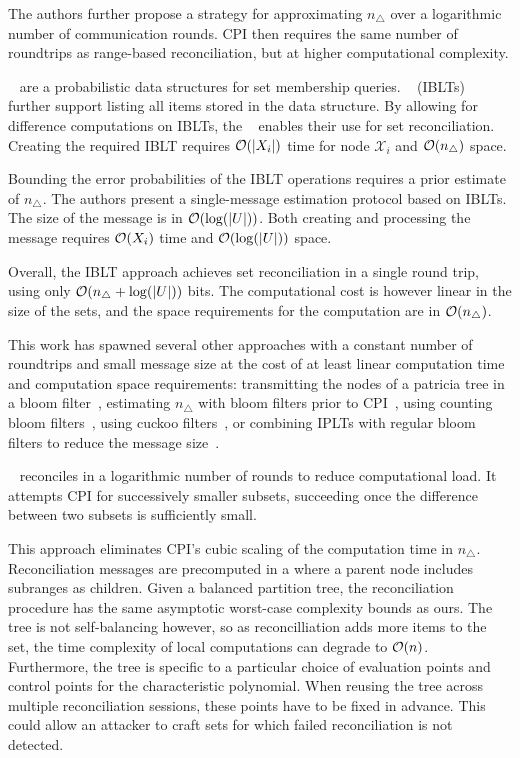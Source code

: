 \documentclass[conference]{IEEEtran}
\begin{document}
The authors further propose a strategy for approximating $n_{\triangle}$ over a logarithmic number of communication rounds. CPI then requires the same number of roundtrips as range-based reconciliation, but at higher computational complexity.

~\cite{bloom1970space} are a probabilistic data structures for set membership queries. ~\cite{goodrich2011invertible} (IBLTs) further support listing all items stored in the data structure. By allowing for difference computations on IBLTs, the ~\cite{eppstein2011s} enables their use for set reconciliation. Creating the required IBLT requires $\mathcal{O}(|{X_i}|)$ time for node $\mathcal{X}_i$ and $\mathcal{O}(n_{\triangle})$ space.

Bounding the error probabilities of the IBLT operations requires a prior estimate of $n_{\triangle}$. The authors present a single-message estimation protocol based on IBLTs. The size of the message is in $\mathcal{O}(\log(|{U}|))$. Both creating and processing the message requires $\mathcal{O}(X_i)$ time and $\mathcal{O}(\log(|{U}|))$ space.

Overall, the IBLT approach achieves set reconciliation in a single round trip, using only $\mathcal{O}(n_{\triangle} + \log(|{U}|))$ bits. The computational cost is however linear in the size of the sets, and the space requirements for the computation are in $\mathcal{O}(n_{\triangle})$.

This work has spawned several other approaches with a constant number of roundtrips and small message size at the cost of at least linear computation time and computation space requirements: transmitting the nodes of a patricia tree in a bloom filter~\cite{byers2002fast}, estimating $n_{\triangle}$ with bloom filters prior to CPI~\cite{tian2011exact}, using counting bloom filters~\cite{guo2012set}, using cuckoo filters~\cite{luo2019set}, or combining IPLTs with regular bloom filters to reduce the message size~\cite{ozisik2019graphene}.

~\cite{minsky2002practical} reconciles in a logarithmic number of rounds to reduce computational load. It attempts CPI for successively smaller subsets, succeeding once the difference between two subsets is sufficiently small.

This approach eliminates CPI's cubic scaling of the computation time in $n_{\triangle}$. Reconciliation messages are precomputed in a  where a parent node includes subranges as children. Given a balanced partition tree, the reconciliation procedure has the same asymptotic worst-case complexity bounds as ours. The tree is not self-balancing however, so as reconcilliation adds more items to the set, the time complexity of local computations can degrade to $\mathcal{O}(n)$. Furthermore, the tree is specific to a particular choice of evaluation points and control points for the characteristic polynomial. When reusing the tree across multiple reconciliation sessions, these points have to be fixed in advance. This could allow an attacker to craft sets for which failed reconciliation is not detected.
\end{document}

